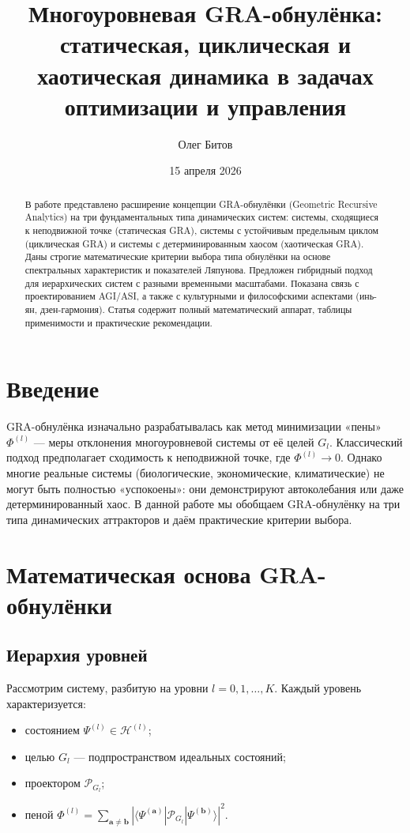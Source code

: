 \documentclass[12pt,a4paper]{article}
\title{Многоуровневая GRA-обнулёнка: статическая, циклическая и хаотическая динамика в задачах оптимизации и управления}
\author{Олег Битов}
\date{15 апреля 2026}
\begin{document}
\maketitle

\begin{abstract}
В работе представлено расширение концепции GRA-обнулёнки (Geometric Recursive Analytics) на три фундаментальных типа динамических систем: системы, сходящиеся к неподвижной точке (статическая GRA), системы с устойчивым предельным циклом (циклическая GRA) и системы с детерминированным хаосом (хаотическая GRA). Даны строгие математические критерии выбора типа обнулёнки на основе спектральных характеристик и показателей Ляпунова. Предложен гибридный подход для иерархических систем с разными временными масштабами. Показана связь с проектированием AGI/ASI, а также с культурными и философскими аспектами (инь-ян, дзен-гармония). Статья содержит полный математический аппарат, таблицы применимости и практические рекомендации.
\end{abstract}

\section{Введение}

GRA-обнулёнка изначально разрабатывалась как метод минимизации «пены» \(\Phi^{(l)}\) — меры отклонения многоуровневой системы от её целей \(G_l\). Классический подход предполагает сходимость к неподвижной точке, где \(\Phi^{(l)} \to 0\). Однако многие реальные системы (биологические, экономические, климатические) не могут быть полностью «успокоены»: они демонстрируют автоколебания или даже детерминированный хаос. В данной работе мы обобщаем GRA-обнулёнку на три типа динамических аттракторов и даём практические критерии выбора.

\section{Математическая основа GRA-обнулёнки}

\subsection{Иерархия уровней}

Рассмотрим систему, разбитую на уровни \(l = 0,1,\dots,K\). Каждый уровень характеризуется:

\begin{itemize}
    \item состоянием \(\Psi^{(l)} \in \mathcal{H}^{(l)}\);
    \item целью \(G_l\) — подпространством идеальных состояний;
    \item проектором \(\mathcal{P}_{G_l}\);
    \item пеной \(\Phi^{(l)} = \sum_{\mathbf{a}\neq\mathbf{b}} |\langle \Psi^{(\mathbf{a})}|\mathcal{P}_{G_l}|\Psi^{(\mathbf{b})}\rangle|^2\).
\end{itemize}
\end{document}

